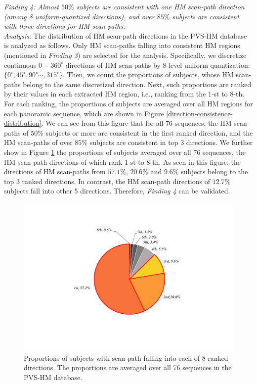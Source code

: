 \documentclass[10pt,journal,compsoc]{IEEEtran}
\begin{document}
\emph{Finding 4: Almost $50\%$ subjects are consistent with one HM scan-path direction (among 8 uniform-quantized directions), and over $85\%$ subjects are consistent with three directions for HM scan-paths. }
\\ \textit{Analysis:} The distribution of HM scan-path directions in the PVS-HM database is analyzed as follows.
Only HM scan-paths falling into consistent HM regions (mentioned in \textit{Finding 3}) are selected for the analysis.
Specifically, we discretize continuous $0-360^{\circ}$ directions of HM scan-paths by 8-level uniform quantization: $\{0^{\circ}, 45^{\circ}, 90^{\circ} \cdots, 315^{\circ} \}$.
Then, we count the proportions of subjects, whose HM scan-paths belong to the same discretized direction. Next, such proportions are ranked by their values in each extracted HM region, i.e., ranking from the 1-st to 8-th. For each ranking, the proportions of subjects are averaged over all HM regions for each panoramic sequence, which are shown in Figure \ref{direction-consistence-distribution}.
We can see from this figure that for all 76 sequences, the HM scan-paths of $50\%$ subjects or more are consistent in the first ranked direction, and the HM scan-paths of over $85\%$ subjects are consistent in top 3 directions. We further show in Figure \ref{direction-consistence-pie} the proportions of subjects averaged over all 76 sequences, the HM scan-path directions of which rank 1-st to 8-th.
As seen in this figure, the directions of HM scan-paths from $57.1\%$, $20.6\%$ and $9.6\%$ subjects belong to the top 3 ranked directions. In contrast, the HM scan-path directions of $12.7\%$ subjects fall into other 5 directions. Therefore, \textit{Finding 4} can be validated.

\begin{figure}
	\begin{center}
		\centerline{\includegraphics[width=.6\columnwidth]{figures/database/direction-consistence-distribution-pie}}%
		\caption{\footnotesize{Proportions of subjects with scan-path falling into each of 8 ranked directions. The proportions are averaged over all 76 sequences in the PVS-HM database. }}
		\label{direction-consistence-pie}
	\end{center}
\end{figure}
\end{document}
